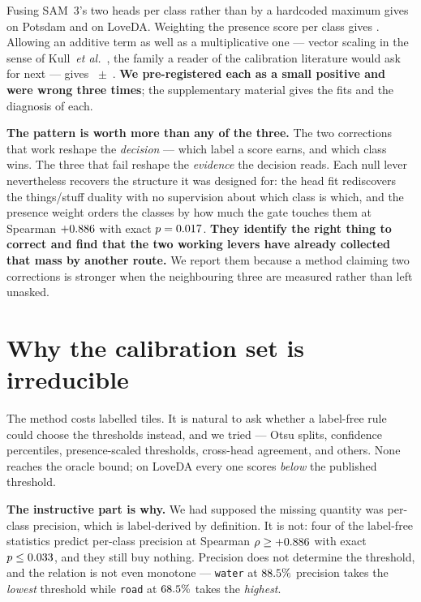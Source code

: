 \documentclass[10pt,twocolumn,letterpaper]{article}          %
\newcommand{\best}[1]{\textbf{#1}}
\providecommand{\etal}{\textit{et al.}}
\newcommand{\suppref}[1]{the supplementary material}
\begin{document}
Fusing SAM~3's two heads per class rather than by a hardcoded maximum gives
\lvThreePots{} on Potsdam and \lvThreeLove{} on LoveDA. Weighting the presence
score per class gives \lvFour{}. Allowing an additive term as well as a
multiplicative one --- vector scaling in the sense of
Kull~\etal~\cite{kull2019}, the family a reader of the calibration literature
would ask for next --- gives \lvFive{}~$\pm$~\lvFiveSD{}. \best{We
pre-registered each as a small positive and were wrong three times};
\suppref{sec:levers} gives the fits and the diagnosis of each.

\best{The pattern is worth more than any of the three.} The two corrections that
work reshape the \emph{decision} --- which label a score earns, and which class
wins. The three that fail reshape the \emph{evidence} the decision reads. Each
null lever nevertheless recovers the structure it was designed for: the head fit
rediscovers the things/stuff duality with no supervision about which class is
which, and the presence weight orders the classes by how much the gate touches
them at Spearman $+0.886{}$ with exact $p = 0.017{}$. \best{They identify the right
thing to correct and find that the two working levers have already collected that
mass by another route.} We report them because a method claiming two corrections
is stronger when the neighbouring three are measured rather than left unasked.

\section{Why the calibration set is irreducible}
\label{sec:bound}

The method costs \calibTiles{} labelled tiles. It is natural to ask whether a
label-free rule could choose the thresholds instead, and we tried \nAttempts{} ---
Otsu splits, confidence percentiles, presence-scaled thresholds, cross-head agreement,
and others. None reaches the oracle bound; on LoveDA every one scores \emph{below} the
published threshold.

\best{The instructive part is why.} We had supposed the missing quantity was per-class
precision, which is label-derived by definition. It is not: four of the label-free
statistics predict per-class precision at Spearman $\rho \geq +0.886{}$ with exact
$p \leq 0.033{}$, and they still buy nothing. Precision does not determine the
threshold, and the relation is not even monotone --- \texttt{water} at $88.5{}\%$
precision takes the \emph{lowest} threshold while \texttt{road} at $68.5{}\%$ takes the
\emph{highest}.
\end{document}
